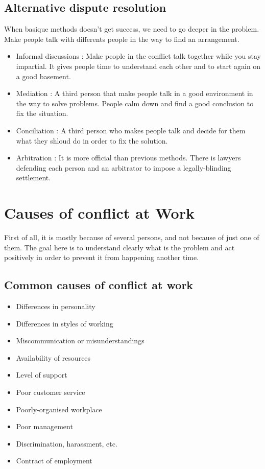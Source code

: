 \documentclass[a4paper,12pt]{report} %
\begin{document}
\subsection{Alternative dispute resolution}
When basique methods doesn't get success, we need to go deeper in the problem. Make people talk with differents people in the way to find an arrangement.
\begin{itemize}
\item Informal discussions : Make people in the conflict talk together while you stay impartial. It gives people time to understand each other and to start again on a good basement.
\item Mediation : A third person that make people talk in a good environment in the way to solve problems. People calm down and find a good conclusion to fix the situation.
\item Conciliation : A third person who makes people talk and decide for them what they shloud do in order to fix the solution.
\item Arbitration : It is more official than previous methods. There is lawyers defending each person and an arbitrator to impose a legally-blinding settlement.
\end{itemize}
\section{Causes of conflict at Work}
First of all, it is mostly because of several persons, and not because of just one of them. The goal here is to understand clearly what is the problem and act positively in order to prevent it from happening another time.
\subsection{Common causes of conflict at work}
\begin{itemize}
\item Differences in personality
\item Differences in styles of working
\item Miscommunication or misunderstandings
\item Availability of resources
\item Level of support
\item Poor customer service
\item Poorly-organised workplace
\item Poor management
\item Discrimination, harassment, etc.
\item Contract of employment
\end{itemize}
\end{document}
